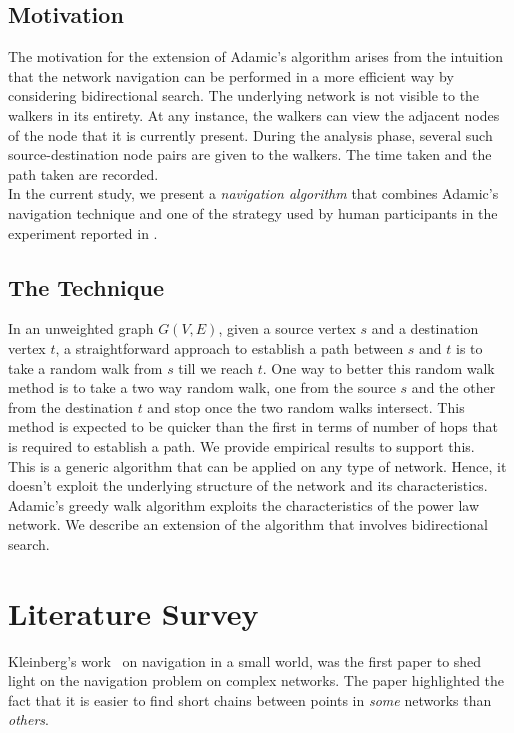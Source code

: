 \documentclass[a4paper,12pt]{article}
\begin{document}
\subsection{Motivation}

The motivation for the extension of Adamic's algorithm arises from the intuition that the network navigation can be performed in a more efficient way by considering bidirectional search. The underlying network is not visible to the walkers in its entirety. At any instance, the walkers can view the adjacent nodes of the node that it is currently present. During the analysis phase, several such source-destination node pairs are given to the walkers. The time taken and the path taken are recorded.\\

In the current study, we present a \emph{navigation algorithm} that combines Adamic's navigation technique and one of the strategy used by human participants in the experiment reported in \cite{sudarshan11}. 

\subsection{The Technique}
In an unweighted graph $G(V,E)$, given a source vertex $s$ and a destination vertex $t$, a straightforward approach to establish a path between $s$ and $t$ is to take a random walk from $s$ till we reach $t$. One way to better this random walk method is to take a two way random walk, one from the source $s$ and the other from the destination $t$ and stop once the two random walks intersect. This method is expected to be quicker than the first in terms of number of hops that is required to establish a path. We provide empirical results to support this.\\

This is a generic algorithm that can be applied on any type of network. Hence, it doesn't exploit the underlying structure of the network and its characteristics. Adamic's greedy walk algorithm exploits the characteristics of the power law network. We describe an extension of the algorithm that involves bidirectional search.

\section{Literature Survey}
\label{sec:4_related_work}
Kleinberg's work~\cite{kleinberg-2-00} on navigation in a small world, was the first paper to shed light on the navigation problem on complex networks. The paper highlighted the fact that it is easier to find short chains between points in \emph{some} networks than \emph{others}.\\
\end{document}
